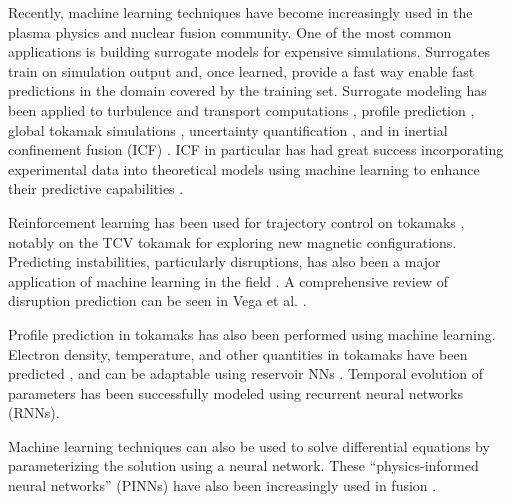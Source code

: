 Recently, machine learning techniques have become increasingly used in the plasma physics and nuclear fusion community. 
One of the most common applications is building surrogate models for expensive simulations. Surrogates train on simulation output and, once learned, provide a fast way enable fast predictions in the domain covered by the training set. Surrogate modeling \cite{taylor_how_2021} has been applied to turbulence and transport computations \cite{meneghini_neural-network_nodate,li_surrogate_2025,fransson_fast_2023,ho_neural_2021}, profile prediction \cite{morosohk_realtime_2023}, global tokamak simulations \cite{dong_deep_2021}, uncertainty quantification \cite{yudin_uncertainty_2024}, and in inertial confinement fusion (ICF) \cite{nora_ensemble_2017, anirudh_improved_2019}. ICF in particular has had great success incorporating experimental data into theoretical models using machine learning to enhance their predictive capabilities  \cite{gaffney_making_2019, humbird_cognitive_2021, gopalaswamy_tripled_2019}.

Reinforcement learning has been used for trajectory control on tokamaks \cite{seo_feedforward_2021, seo_development_2022, seo_avoiding_2024}, notably on the TCV tokamak \cite{degrave_magnetic_2022,tracey_towards_2024} for exploring new magnetic configurations. Predicting instabilities, particularly disruptions, has also been a major application of machine learning in the field \cite{rea_real-time_2019, kates-harbeck_predicting_2019, pau_machine_2019,fu_machine_2020, murari_investigating_2020, rea_progress_2020, rossi_hybrid_2024}. A comprehensive review of disruption prediction can be seen in Vega et al. \cite{vega_disruption_2022}. 

Profile prediction in tokamaks has also been performed using machine learning. Electron density, temperature, and other quantities in tokamaks have been predicted \cite{abbate_data-driven_2021, dong_machine_2021}, and can be adaptable using reservoir NNs  \cite{jalalvand_real-time_2022}. Temporal evolution of parameters has been successfully modeled using recurrent neural networks (RNNs)\cite{char_full_2024, wan_east_2022, seo_feedforward_2021, seo_development_2022}.

Machine learning techniques can also be used to solve differential equations by parameterizing the solution using a neural network. These ``physics-informed neural networks'' (PINNs) have also been increasingly used in fusion \cite{rossi_potential_2023, aymerich_physics_2023, seo_leveraging_2024}.

